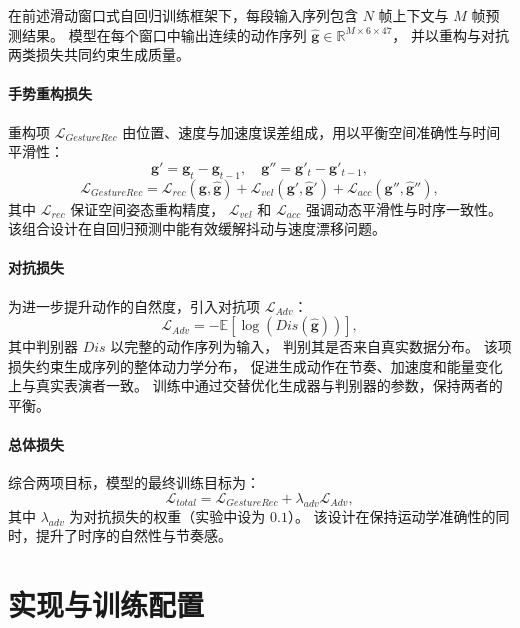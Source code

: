在前述滑动窗口式自回归训练框架下，每段输入序列包含 $N$ 帧上下文与 $M$ 帧预测结果。
模型在每个窗口中输出连续的动作序列 $\hat{\bm{g}} \in \mathbb{R}^{M \times 6 \times 47}$，
并以重构与对抗两类损失共同约束生成质量。

\paragraph{手势重构损失}
重构项 $\mathcal{L}_{Gesture Rec}$ 由位置、速度与加速度误差组成，用以平衡空间准确性与时间平滑性：
\begin{equation}
\bm{g}' = \bm{g}_t - \bm{g}_{t-1}, \quad \bm{g}'' = \bm{g}'_t - \bm{g}'_{t-1},
\end{equation}
\begin{equation}
\mathcal{L}_{Gesture Rec} = \mathcal{L}_{rec}(\bm{g}, \hat{\bm{g}}) + \mathcal{L}_{vel}(\bm{g}', \hat{\bm{g}}') + \mathcal{L}_{acc}(\bm{g}'', \hat{\bm{g}}''),
\end{equation}
其中 $\mathcal{L}_{rec}$ 保证空间姿态重构精度，
$\mathcal{L}_{vel}$ 和 $\mathcal{L}_{acc}$ 强调动态平滑性与时序一致性。
该组合设计在自回归预测中能有效缓解抖动与速度漂移问题。

\paragraph{对抗损失}
为进一步提升动作的自然度，引入对抗项 $\mathcal{L}_{Adv}$：
\begin{equation}
\mathcal{L}_{Adv} = -\mathbb{E}[\log(Dis(\hat{\bm{g}}))],
\end{equation}
其中判别器 $Dis$ 以完整的动作序列为输入，
判别其是否来自真实数据分布。
该项损失约束生成序列的整体动力学分布，
促进生成动作在节奏、加速度和能量变化上与真实表演者一致。
训练中通过交替优化生成器与判别器的参数，保持两者的平衡。

\paragraph{总体损失}
综合两项目标，模型的最终训练目标为：
\begin{equation}
\mathcal{L}_{total} = \mathcal{L}_{Gesture Rec} + \lambda_{adv}\mathcal{L}_{Adv},
\end{equation}
其中 $\lambda_{adv}$ 为对抗损失的权重（实验中设为 $0.1$）。
该设计在保持运动学准确性的同时，提升了时序的自然性与节奏感。

\section{实现与训练配置}
\label{sec:implementation}

